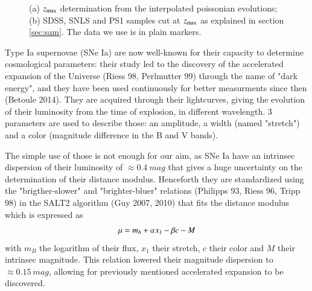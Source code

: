 \documentclass{aa}
\begin{document}
\begin{figure}[htbp!]
    \centering
    \caption{(a) $z_{\text{max}}$ determination from the interpolated poissonian
    evolutions; (b) SDSS, SNLS and PS1 samples cut at $z_{\text{max}}$ as explained in
    section \ref{sec:sam}. The data we use is in plain markers.}
\end{figure}

Type Ia supernovae (SNe Ia) are now well-known for their capacity to determine
cosmological parameters: their study led to the discovery of the accelerated
expansion of the Universe (Riess 98, Perlmutter 99) through the name of "dark
energy", and they have been used continuously for better measurments since then
(Betoule 2014). They are acquired through their lightcurves, giving the
evolution of their luminosity from the time of explosion, in different
wavelength. 3 parameters are used to describe those: an amplitude, a width
(named "stretch") and a color (magnitude difference in the B and V bands).

The simple use of those is not enough for our aim, as SNe Ia have an intrinsec
dispersion of their luminosity of $\approx 0.4~mag$ that gives a huge
uncertainty on the determination of their distance modulus. Henceforth they are
standardized using the "brigther-slower" and "brighter-bluer" relations
(Philipps 93, Riess 96, Tripp 98) in the SALT2 algorithm (Guy 2007, 2010) that
fits the distance modulus which is expressed as
\begin{equation}\label{eq:tripp}
    \mu = m_b + \alpha x_1 - \beta c - M
\end{equation}
with $m_B$ the logarithm of their flux, $x_1$ their stretch, $c$ their color and
$M$ their intrinsec magnitude. This relation lowered their magnitude dispersion
to $\approx 0.15~mag$, allowing for previously mentioned accelerated
expansion to be discovered.
\end{document}
